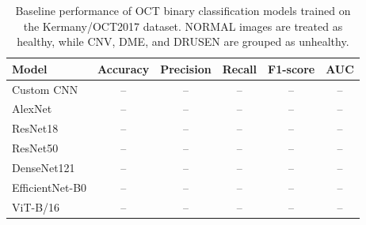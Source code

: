 \begin{table}[!t]
\centering
\caption{Baseline performance of OCT binary classification models trained on the Kermany/OCT2017 dataset. NORMAL images are treated as healthy, while CNV, DME, and DRUSEN are grouped as unhealthy.}
\label{tab:kermany_baselines}
\scriptsize
\begin{tabular}{lccccc}
\toprule
\textbf{Model} & \textbf{Accuracy} & \textbf{Precision} & \textbf{Recall} & \textbf{F1-score} & \textbf{AUC} \\
\midrule
Custom CNN & -- & -- & -- & -- & -- \\
AlexNet & -- & -- & -- & -- & -- \\
ResNet18 & -- & -- & -- & -- & -- \\
ResNet50 & -- & -- & -- & -- & -- \\
DenseNet121 & -- & -- & -- & -- & -- \\
EfficientNet-B0 & -- & -- & -- & -- & -- \\
ViT-B/16 & -- & -- & -- & -- & -- \\
\bottomrule
\end{tabular}
\end{table}
